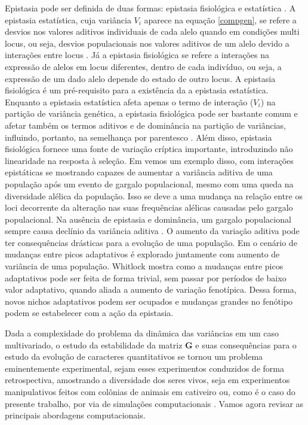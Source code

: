 Epistasia pode ser definida de duas formas: epistasia fisiológica e
estatística \citep{Cheverud1995}.
A epistasia estatística, cuja variância $V_i$ aparece na equação
\ref{compgen}, se refere a desvios nos valores aditivos individuais de
cada alelo quando em condições multi locus, ou seja, desvios
populacionais nos valores aditivos de um alelo devido a interações entre locus
\citep{Falconer1996}.
Já a epistasia fisiológica se refere a interações na expressão de alelos
em locus diferentes, dentro de cada indivíduo, ou seja, a expressão de
um dado alelo depende do estado de outro locus.
A epistasia fisiológica é um pré-requisito para a existência da a
epistasia estatística.
Enquanto a epistasia estatística afeta apenas o termo de interação
($V_i$) na partição de variância genética, a epistasia fisiológica pode
ser bastante comum e afetar também os termos aditivos e de dominância na
partição de variâncias, influindo, portanto, na semelhança por
parentesco \citep{Crow1970, Falconer1996, Cheverud1995, Cheverud1996a}.
Além disso, epistasia fisiológica fornece uma fonte de variação críptica
importante, introduzindo não linearidade na resposta à seleção.
Em \cite{Cheverud1996a} vemos um exemplo disso, com interações
epistáticas se mostrando capazes de aumentar a variância aditiva de uma
população após um evento de gargalo populacional, mesmo com uma queda na
diversidade alélica da população.
Isso se deve a uma mudança na relação entre os loci decorrente da
alteração nas suas frequências alélicas causadas pelo gargalo
populacional.
Na ausência de epistasia e dominância, um gargalo populacional sempre
causa declínio da variância aditiva \citep{Falconer1996}.
O aumento da variação aditiva pode ter consequências drásticas para a
evolução de uma população.
Em \cite{Whitlock1995} o cenário de mudanças entre picos adaptativos é
explorado juntamente com aumento de variância de uma população. 
Whitlock mostra como a mudanças entre picos adaptativos pode ser
feita de forma trivial, sem passar por períodos de baixo valor
adaptativo, quando aliada a aumento de variação fenotípica. 
Dessa forma, novos nichos adaptativos podem ser ocupados e mudanças
grandes no fenótipo podem se estabelecer com a ação da epistasia.

Dada a complexidade do problema da dinâmica das variâncias em um caso
multivariado, o estudo da estabilidade da matriz $\mathbf{G}$ e suas consequências
para o estudo da evolução de caracteres quantitativos se tornou um
problema eminentemente experimental, sejam esses experimentos conduzidos
de forma retrospectiva, amostrando a diversidade dos seres vivos, seja
em experimentos manipulativos feitos com colônias de animais em
cativeiro ou, como é o caso do presente trabalho, por via de simulações
computacionais \citep[para uma revisão sobre estabilidade da matriz $\mathbf{G}$
veja][]{Arnold2008}.
Vamos agora revisar as principais abordagens computacionais.

